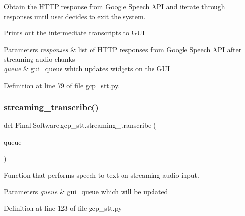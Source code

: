 Obtain the H\+T\+TP response from Google Speech A\+PI and iterate through responses until user decides to exit the system. 

Prints out the intermediate transcripts to G\+UI 
\begin{DoxyParams}{Parameters}
{\em responses} & list of H\+T\+TP responses from Google Speech A\+PI after streaming audio chunks \\
\hline
{\em queue} & gui\+\_\+queue which updates widgets on the G\+UI \\
\hline
\end{DoxyParams}


Definition at line 79 of file gcp\+\_\+stt.\+py.

\mbox{\label{namespace_final_01_software_1_1gcp__stt_abff36f666612ca7f089706fe2987310f}} 
\subsubsection{streaming\_transcribe()}
{\footnotesize\ttfamily def Final Software.\+gcp\+\_\+stt.\+streaming\+\_\+transcribe (\begin{DoxyParamCaption}\item[{}]{queue }\end{DoxyParamCaption})}



Function that performs speech-\/to-\/text on streaming audio input. 


\begin{DoxyParams}{Parameters}
{\em queue} & gui\+\_\+queue which will be updated \\
\hline
\end{DoxyParams}


Definition at line 123 of file gcp\+\_\+stt.\+py.

